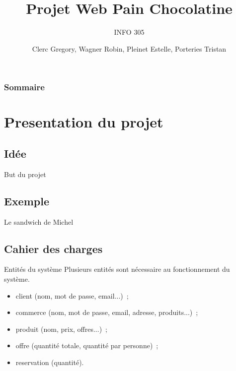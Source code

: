 \documentclass{beamer}
\title{Projet Web Pain Chocolatine}
\subtitle{INFO 305}
\author{Clerc Gregory, Wagner Robin, Pleinet Estelle, Porteries Tristan}
\begin{document}
\begin{frame}
  \titlepage
\end{frame}

\begin{frame}
    \frametitle{Sommaire}
    \begin{multicols}{2}
      {
        \tableofcontents
      }
    \end{multicols}
\end{frame}

\section{Presentation du projet}

\subsection{Idée}

\begin{frame}{But du projet}
	
\end{frame}

\subsection{Exemple}

\begin{frame}{Le sandwich de Michel}
	
\end{frame}

\subsection{Cahier des charges}

\begin{frame}{Entités du système}
	Plusieurs entités sont nécessaire au fonctionnement du système.
	\begin{itemize}
		\item client (nom, mot de passe, email...)~;
		\item commerce (nom, mot de passe, email, adresse, produits...)~;
		\item produit (nom, prix, offres...)~;
		\item offre (quantité totale, quantité par personne)~;
		\item reservation (quantité).
	\end{itemize}

\end{frame}
\end{document}
